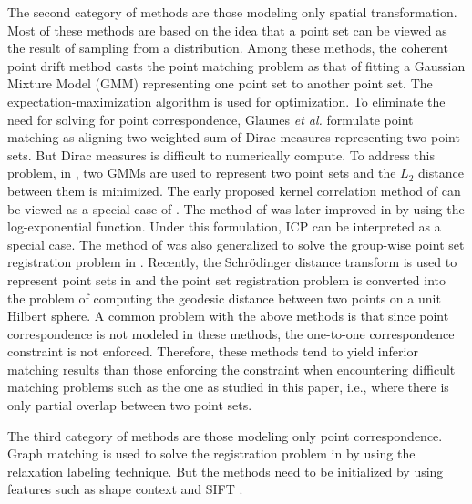 \documentclass[11pt,bezier,]{article}
\begin{document}
The second category of methods are those modeling only spatial transformation.
Most of these methods are based on the idea that
a point set can be viewed  as the result of sampling from a distribution.
Among these methods,
the coherent point drift  method \cite{CPD} casts the point matching problem as that of
fitting a Gaussian Mixture Model (GMM)  representing one point set to another point set.
The expectation-maximization algorithm is used for optimization.
To eliminate the need for solving for point  correspondence,
Glaunes \textit{et al.} \cite{diffeo_match} formulate point matching as 
aligning two weighted sum of Dirac measures representing two point sets.
But  Dirac measures  is difficult to numerically compute.
To address this problem,
in \cite{kernel_Gaussian_journal},
two GMMs are used to represent two point sets  and the $L_2$ distance between them is minimized.
The early proposed kernel correlation method of \cite{kernel_correlation}
can be viewed as a special case of \cite{kernel_Gaussian_journal}.
The method of \cite{kernel_Gaussian_journal} was later improved in \cite{implicit_correspondence} 
by using the log-exponential function.
Under this formulation, ICP can be interpreted as a special case.
The method of \cite{kernel_Gaussian_journal} was also generalized to solve the group-wise point set registration problem
in \cite{kernel_groupwise, kernel_groupwise_IJCV}.
Recently, 
the Schr\"odinger distance transform  is used to represent point sets in \cite{SDT_match}
and  the point set registration problem is converted into  the problem of
 computing the geodesic distance between two points on a unit Hilbert sphere.
A common problem with the above methods is that since point correspondence is not modeled in these methods,
the one-to-one correspondence constraint is not enforced.
Therefore,
these methods tend to yield inferior matching results than those  enforcing the 
constraint
when encountering difficult matching problems such as the one as studied 
in this paper, i.e., where there is only partial overlap between two point sets.


The third category of methods are those  modeling only point correspondence.
Graph matching is used to solve the registration problem in \cite{GM_relax_label, GM_relax_label2}
by using the relaxation labeling technique.
But the methods need to be initialized by using features such as shape context \cite{SC} and SIFT \cite{SIFT}.

\end{document}
